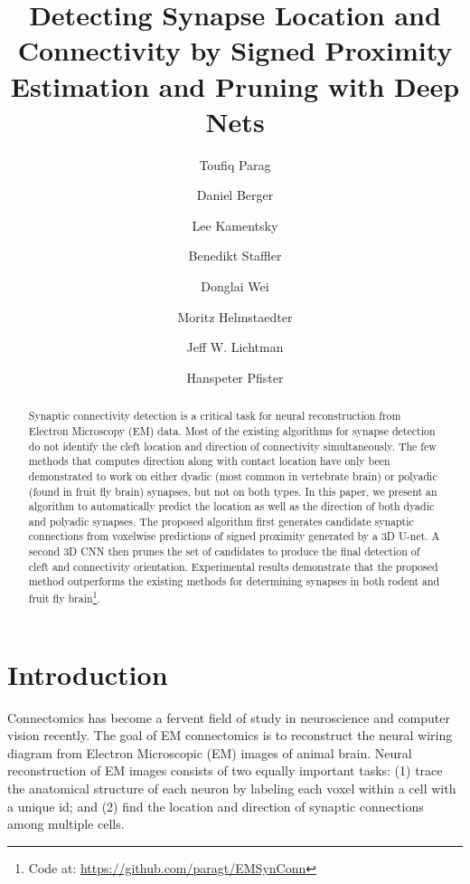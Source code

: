 \documentclass{llncs}
\begin{document}
\title{Detecting Synapse Location and Connectivity by Signed Proximity Estimation and Pruning with Deep Nets}

\author{Toufiq Parag \and Daniel Berger \and Lee Kamentsky \and Benedikt Staffler \and Donglai Wei  \and Moritz Helmstaedter \and 
Jeff W. Lichtman \and Hanspeter Pfister}



\maketitle
\thispagestyle{empty}

\setcounter{footnote}{0}


\begin{abstract}

Synaptic connectivity detection is a critical task for neural reconstruction from Electron Microscopy (EM) data. Most of the existing algorithms for synapse detection do not identify the cleft location and direction of connectivity simultaneously. The few methods that computes direction along with contact location have only been demonstrated to work on either dyadic (most common in vertebrate brain) or polyadic (found in fruit fly brain) synapses, but not on both types. In this paper, we present an algorithm to automatically predict the location as well as the direction of both dyadic and polyadic synapses. The proposed algorithm first generates candidate synaptic connections from voxelwise predictions of signed proximity generated by a 3D U-net. A second 3D CNN then prunes the set of candidates to produce the final detection of cleft and connectivity orientation. Experimental results demonstrate that the proposed method outperforms the existing methods for determining synapses in both rodent and fruit fly brain\footnote{\scriptsize Code at: \url{https://github.com/paragt/EMSynConn}}.

\end{abstract}

\section{Introduction}

Connectomics has become a fervent field of study in neuroscience and computer vision recently. The goal of EM connectomics is to reconstruct the neural wiring diagram from Electron Microscopic (EM) images of animal brain. Neural reconstruction of EM images consists of two equally important tasks: (1) trace the anatomical structure of each neuron by labeling each voxel within a cell with a unique id; and (2) find the location and direction of synaptic connections among multiple cells.
\end{document}
